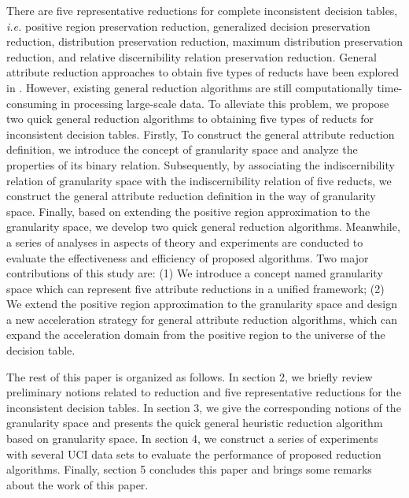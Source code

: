 \documentclass[review]{elsarticle}
\begin{document}
	\par There are five representative reductions for complete inconsistent decision tables, \emph{i.e.} positive region preservation reduction, generalized decision preservation reduction, distribution preservation reduction, maximum distribution preservation reduction, and relative discernibility relation preservation reduction. General attribute reduction approaches to obtain five types of reducts have been explored in \cite{ge2017quick}. However, existing general reduction algorithms are still computationally time-consuming in processing large-scale data. To alleviate this problem, we propose two quick general reduction algorithms to obtaining five types of reducts for inconsistent decision tables. 
	Firstly, To construct the general attribute reduction definition, we introduce the concept of granularity space and analyze the properties of its binary relation. Subsequently, by associating the indiscernibility relation of granularity space with the indiscernibility relation of five reducts, we construct the general attribute reduction definition in the way of granularity space. Finally, based on extending the positive region approximation to the granularity space, we develop two quick general reduction algorithms. Meanwhile, a series of analyses in aspects of theory and experiments are conducted to evaluate the effectiveness and efficiency of proposed algorithms. 
	Two major contributions of this study are: (1) We introduce a concept named granularity space which can represent five attribute reductions in a unified framework; (2) We extend the positive region approximation to the granularity space and design a new acceleration strategy for general attribute reduction algorithms, which can expand the acceleration domain from the positive region to the universe of the decision table.
	
	\par The rest of this paper is organized as follows. In section 2, we briefly review preliminary notions related to reduction and five representative reductions for the inconsistent decision tables. In section 3, we give the corresponding notions of the granularity space and presents the quick general heuristic reduction algorithm based on granularity space. In section 4, we construct a series of experiments with several UCI data sets to evaluate the performance of proposed reduction algorithms. Finally, section 5 concludes this paper and brings some remarks about the work of this paper.
	
\end{document}

